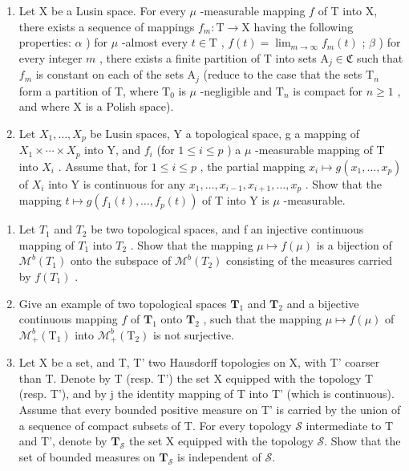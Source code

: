 \begin{enumerate}
\def\labelenumi{\alph{enumi})}
\item
  Let X be a Lusin space. For every \(\mu\) -measurable mapping \(f\) of T into X, there exists a sequence of mappings \(f_m: \mathrm{T} \to \mathrm{X}\) having the following properties: \(\alpha\) ) for \(\mu\) -almost every \(t \in \mathrm{T}\) , \(f(t) = \lim_{m \to \infty} f_m(t)\) ; \(\beta\) ) for every integer \(m\) , there exists a finite partition of T into sets \(\mathrm{A}_j \in \mathfrak{C}\) such that \(f_m\) is constant on each of the sets \(\mathrm{A}_j\) (reduce to the case that the sets \(\mathrm{T}_n\) form a partition of T, where \(\mathrm{T}_0\) is \(\mu\) -negligible and \(\mathrm{T}_n\) is compact for \(n \geqslant 1\) , and where X is a Polish space).
\item
  Let \(X_{1},\ldots,X_{p}\) be Lusin spaces, Y a topological space, g a mapping of \(X_{1}\times\cdots\times X_{p}\) into Y, and \(f_{i}\) (for \(1\leqslant i\leqslant p\) ) a \(\mu\) -measurable mapping of T into \(X_{i}\) . Assume that, for \(1\leqslant i\leqslant p\) , the partial mapping \(x_{i}\mapsto g(x_{1},\ldots,x_{p})\) of \(X_{i}\) into Y is continuous for any \(x_{1},\ldots,x_{i-1},x_{i+1},\ldots,x_{p}\) . Show that the mapping \(t\mapsto g(f_{1}(t),\ldots,f_{p}(t))\) of T into Y is \(\mu\) -measurable.
\end{enumerate}

\exercisesection{}

\begin{enumerate}
\def\labelenumi{\arabic{enumi})}
\item
  Let \(T_{1}\) and \(T_{2}\) be two topological spaces, and f an injective continuous mapping of \(T_{1}\) into \(T_{2}\) . Show that the mapping \(\mu \mapsto f(\mu)\) is a bijection of \(\mathcal{M}^{b}(T_{1})\) onto the subspace of \(\mathcal{M}^{b}(T_{2})\) consisting of the measures carried by \(f(T_{1})\) .
\item
  Give an example of two topological spaces \(\mathbf{T}_1\) and \(\mathbf{T}_2\) and a bijective continuous mapping \(f\) of \(\mathbf{T}_1\) onto \(\mathbf{T}_2\) , such that the mapping \(\mu \mapsto f(\mu)\) of \(\mathcal{M}_+^b (\mathrm{T}_1)\) into \(\mathcal{M}_+^b (\mathrm{T}_2)\) is not surjective.
\item
  Let X be a set, and T, T' two Hausdorff topologies on X, with T' coarser than T. Denote by T (resp. T') the set X equipped with the topology T (resp. T'), and by j the identity mapping of T into T' (which is continuous). Assume that every bounded positive measure on T' is carried by the union of a sequence of compact subsets of T. For every topology \(\mathcal{S}\) intermediate to T and T', denote by \(\mathbf{T}_{\mathcal{S}}\) the set X equipped with the topology \(\mathcal{S}\). Show that the set of bounded measures on \(\mathbf{T}_{\mathcal{S}}\) is independent of \(\mathcal{S}\).
\end{enumerate}
